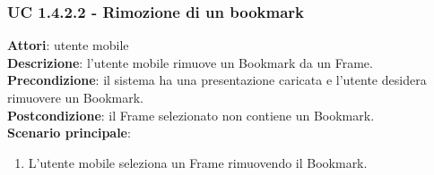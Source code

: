 \subsubsection{UC 1.4.2.2 - Rimozione di un bookmark}{
	\label{uc1.4.2.2}
	\textbf{Attori}: utente mobile \\
	\textbf{Descrizione}: l'utente mobile rimuove un Bookmark da un Frame. \\
	\textbf{Precondizione}: il sistema ha una presentazione caricata e l'utente desidera rimuovere un Bookmark.	\\
	\textbf{Postcondizione}: il Frame selezionato non contiene un Bookmark.	\\
	\textbf{Scenario principale}:
	\begin{enumerate}
		\item L'utente mobile seleziona un Frame rimuovendo il Bookmark.
	\end{enumerate}
	}